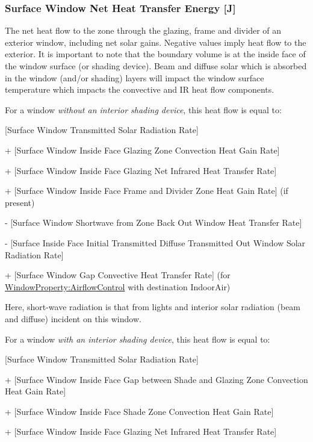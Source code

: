 \subsubsection{Surface Window Net Heat Transfer Energy {[}J{]}}\label{surface-window-net-heat-transfer-rate-j}

The net heat flow to the zone through the glazing, frame and divider of an exterior window, including net solar gains. Negative values imply heat flow to the exterior. It is important to note that the boundary volume is at the inside face of the window surface (or shading device). Beam and diffuse solar which is absorbed in the window (and/or shading) layers will impact the window surface temperature which impacts the convective and IR heat flow components.

For a window \emph{without an interior shading device}, this heat flow is equal to:

  {[}Surface Window Transmitted Solar Radiation Rate{]}
  
  + {[}Surface Window Inside Face Glazing Zone Convection Heat Gain Rate{]}
  
  + {[}Surface Window Inside Face Glazing Net Infrared Heat Transfer Rate{]}
  
  + {[}Surface Window Inside Face Frame and Divider Zone Heat Gain Rate{]} (if present)
  
  - {[}Surface Window Shortwave from Zone Back Out Window Heat Transfer Rate{]}
  
  - {[}Surface Inside Face Initial Transmitted Diffuse Transmitted Out Window Solar Radiation Rate{]}

  + {[Surface Window Gap Convective Heat Transfer Rate] (for \hyperref[windowpropertyairflowcontrol]{WindowProperty:AirflowControl} with destination IndoorAir)}

Here, short-wave radiation is that from lights and interior solar radiation (beam and diffuse) incident on this window.

For a window \emph{with an interior shading device}, this heat flow is equal to:

  {[}Surface Window Transmitted Solar Radiation Rate{]}

  + {[}Surface Window Inside Face Gap between Shade and Glazing Zone Convection Heat Gain Rate{]}

  + {[}Surface Window Inside Face Shade Zone Convection Heat Gain Rate{]}

  + {[}Surface Window Inside Face Glazing Net Infrared Heat Transfer Rate{]}

